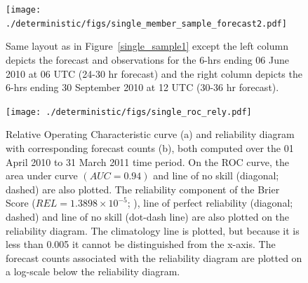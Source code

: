 \newpage
\begin{figure}[ht]
    \centering
    \texttt{[image: ./deterministic/figs/single\_member\_sample\_forecast2.pdf]}\\
    \caption{Same layout as in \mbox{Figure \ref{single_sample1}} except the left column depicts the forecast and observations for the 6-hrs ending 06 June 2010 at 06 UTC (24-30 hr forecast) and the right column depicts the 6-hrs ending 30 September 2010 at 12 UTC (30-36 hr forecast).}
    \label{single_sample2}
\end{figure}


\newpage
\begin{figure}[ht]
    \centering
    \noindent\texttt{[image: ./deterministic/figs/single\_roc\_rely.pdf]}\\
    \caption{Relative Operating Characteristic curve (a) and reliability diagram with corresponding forecast counts (b), both computed over the 01 April 2010 to 31 March 2011 time period. On the ROC curve, the area under curve $(AUC = 0.94)$ and line of no skill (diagonal; dashed) are also plotted. The reliability component of the Brier Score ($REL = 1.3898 \times 10^{-5}$; \citealp{Murphy1973}), line of perfect reliability (diagonal; dashed) and line of no skill (dot-dash line) are also plotted on the reliability diagram. The climatology line is plotted, but because it is less than 0.005 it cannot be distinguished from the x-axis. The forecast counts associated with the reliability diagram are plotted on a log-scale below the reliability diagram.}
    \label{single_roc_rely}
\end{figure}



